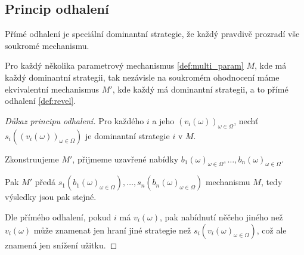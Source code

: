 \subsection{Princip odhalení}

\begin{definition}\label{def:revel}
  Přímé odhalení je speciální dominantní strategie, že každý pravdivě prozradí vše soukromé mechanismu. 
\end{definition}

\begin{theorem}
    \label{thm:revelation}
    Pro každý několika parametrový mechanismus \ref{def:multi_param} $M$, kde má každý dominantní strategii, tak nezávisle na soukromém ohodnocení máme ekvivalentní mechanismus $M'$, kde každý má dominantní strategii, a to přímé odhalení \ref{def:revel}. 
\end{theorem}
\begin{proof}[Důkaz principu odhalení]
    Pro každého $i$ a jeho $(v_i(\omega))_{\omega \in \Omega}$, nechť $s_i((v_i(\omega))_{\omega \in \Omega})$ je dominantní strategie $i$ v $M$. 

    Zkonstruujeme $M'$, přijmeme uzavřené nabídky $b_1(\omega)_{\omega \in \Omega}, \dots, b_n(\omega)_{\omega \in \Omega}$. 
    
    Pak $M'$ předá $s_1(b_1(\omega)_{\omega \in \Omega}), \dots, s_n(b_n(\omega)_{\omega \in \Omega})$ mechanismu $M$, tedy výsledky jsou pak stejné. 

    Dle přímého odhalení, pokud $i$ má $v_i(\omega)$, pak nabídnutí něčeho jiného než $v_i(\omega)$ může znamenat jen hraní jiné strategie než $s_i(v_i(\omega)_{\omega \in \Omega})$, což ale znamená jen snížení užitku. 
\end{proof}
